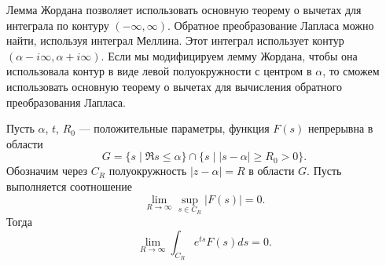 \documentclass[../paper.tex]{subfile}
\begin{document}
Лемма Жордана позволяет использовать основную теорему о вычетах для интеграла по контуру $(-\infty, \infty)$.
Обратное преобразование Лапласа можно найти, используя интеграл Меллина. Этот интеграл использует контур $(\alpha - i\infty, \alpha + i\infty)$.
Если мы модифицируем лемму Жордана, чтобы она использовала контур в виде левой полуокружности с центром в $\alpha$, то сможем использовать основную теорему о вычетах для вычисления обратного преобразования Лапласа.
%
\begin{Lem}\label{modified-jordan}
Пусть $\alpha$, $t$, $R_0$ --- положительные параметры, 
функция $F(s)$ непрерывна в области 
\[
	G = \{s \mid \Re s \le  \alpha \} \cap \{ s \mid |s-\alpha| \ge  R_0 > 0 \}
.\]
Обозначим через $C_R$ полуокружность $|z-\alpha| = R$ в области $G$.
Пусть выполняется соотношение
\[
	\lim\limits_{R \to \infty} \sup\limits_{s \in C_R} |F(s)| = 0
.\]
Тогда
\[
	\lim_{R \to \infty} \int_{C_R} e^{ts} F(s)ds = 0
.\]
\end{Lem}
\end{document}
